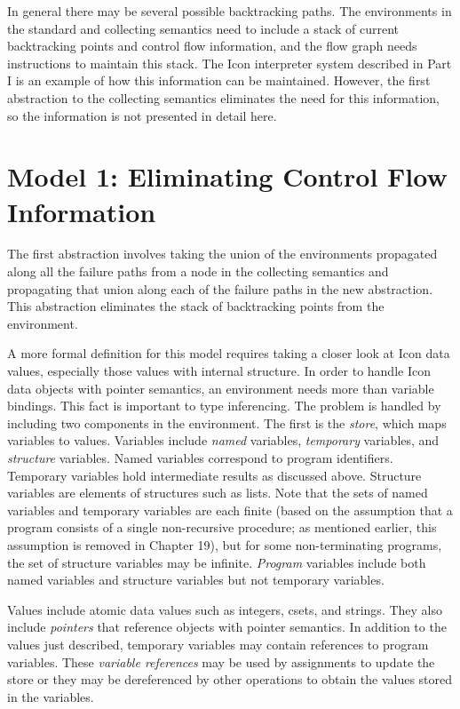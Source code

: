 In general there may be several possible backtracking paths. The
environments in the standard and collecting semantics need to include
a stack of current backtracking points and control flow information,
and the flow graph needs instructions to maintain this stack. The Icon
interpreter system described in Part I is an example of how this
information can be maintained. However, the first abstraction to the
collecting semantics eliminates the need for this information, so the
information is not presented in detail here.

\section*{Model 1: Eliminating Control Flow Information}

The first abstraction involves taking the union of the environments
propagated along all the failure paths from a node in the collecting
semantics and propagating that union along each of the failure paths
in the new abstraction. This abstraction eliminates the stack of
backtracking points from the environment.

A more formal definition for this model requires taking a closer look
at Icon data values, especially those values with internal
structure. In order to handle Icon data objects with pointer
semantics, an environment needs more than variable bindings. This fact
is important to type inferencing. The problem is handled by including
two components in the environment. The first is the \textit{store},
which maps variables to values. Variables include \textit{named}
variables, \textit{temporary} variables, and \textit{structure}
variables. Named variables correspond to program
identifiers. Temporary variables hold intermediate results as
discussed above. Structure variables are elements of structures such
as lists. Note that the sets of named variables and temporary
variables are each finite (based on the assumption that a program
consists of a single non-recursive procedure; as mentioned earlier,
this assumption is removed in Chapter 19), but for some
non-terminating programs, the set of structure variables may be
infinite.  \textit{Program} variables include both named variables and
structure variables but not temporary variables.

Values include atomic data values such as integers, csets, and
strings. They also include \textit{pointers} that reference objects
with pointer semantics. In addition to the values just described,
temporary variables may contain references to program variables. These
\textit{variable references} may be used by assignments to update the
store or they may be dereferenced by other operations to obtain the
values stored in the variables.

